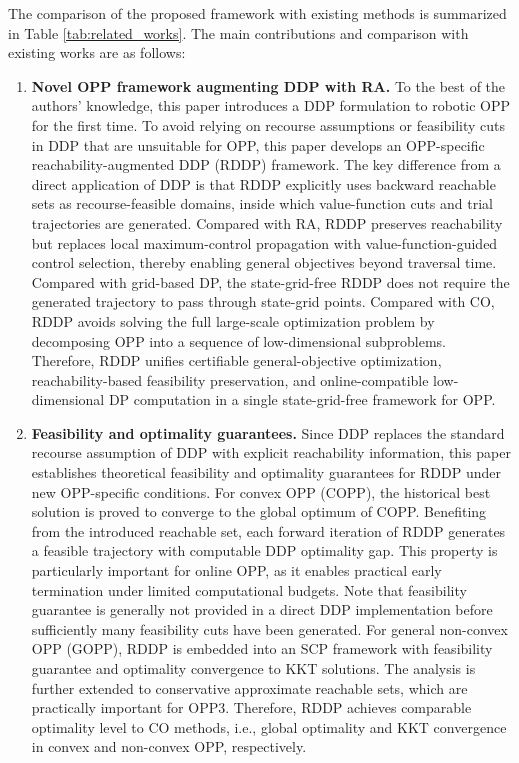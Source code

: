 \documentclass[journal]{IEEEtran}
\theoremstyle{definition}
\theoremstyle{definition}
\begin{document}
The comparison of the proposed framework with existing methods is summarized in Table \ref{tab:related_works}. The main contributions and comparison with existing works are as follows:
\begin{enumerate}
    \item \textbf{Novel OPP framework augmenting DDP with RA.} To the best of the authors' knowledge, this paper introduces a DDP formulation to robotic OPP for the first time. To avoid relying on recourse assumptions or feasibility cuts in DDP that are unsuitable for OPP, this paper develops an OPP-specific reachability-augmented DDP (RDDP) framework. The key difference from a direct application of DDP is that RDDP explicitly uses backward reachable sets as recourse-feasible domains, inside which value-function cuts and trial trajectories are generated. Compared with RA, RDDP preserves reachability but replaces local maximum-control propagation with value-function-guided control selection, thereby enabling general objectives beyond traversal time. Compared with grid-based DP, the state-grid-free RDDP does not require the generated trajectory to pass through state-grid points. Compared with CO, RDDP avoids solving the full large-scale optimization problem by decomposing OPP into a sequence of low-dimensional subproblems. Therefore, RDDP unifies certifiable general-objective optimization, reachability-based feasibility preservation, and online-compatible low-dimensional DP computation in a single state-grid-free framework for OPP.
    \item \textbf{Feasibility and optimality guarantees.} Since DDP replaces the standard recourse assumption of DDP with explicit reachability information, this paper establishes theoretical feasibility and optimality guarantees for RDDP under new OPP-specific conditions. For convex OPP (COPP), the historical best solution is proved to converge to the global optimum of COPP. Benefiting from the introduced reachable set, each forward iteration of RDDP generates a feasible trajectory with computable DDP optimality gap. This property is particularly important for online OPP, as it enables practical early termination under limited computational budgets. Note that feasibility guarantee is generally not provided in a direct DDP implementation before sufficiently many feasibility cuts have been generated. For general non-convex OPP (GOPP), RDDP is embedded into an SCP framework with feasibility guarantee and optimality convergence to KKT solutions. The analysis is further extended to conservative approximate reachable sets, which are practically important for OPP3. Therefore, RDDP achieves comparable optimality level to CO methods, i.e., global optimality and KKT convergence in convex and non-convex OPP, respectively.

\end{enumerate}
\end{document}

